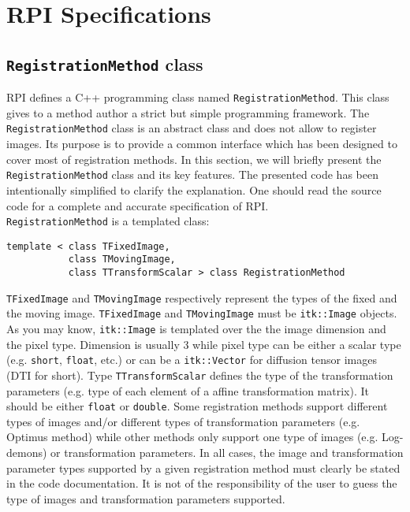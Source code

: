 \section{RPI Specifications}



\subsection{\texttt{RegistrationMethod} class}


RPI defines a C++ programming class named \texttt{RegistrationMethod}. This class gives to a method author a strict but simple programming framework. The \texttt{RegistrationMethod} class is an abstract class and does not allow to register images. Its purpose is to provide a common interface which has been designed to cover most of registration methods. In this section, we will briefly present the \texttt{RegistrationMethod} class and its key features. The presented code has been intentionally simplified to clarify the explanation. One should read the source code for a complete and accurate specification of RPI.
\\

\texttt{RegistrationMethod} is a templated class:
\\
%
\begin{lstlisting}
template < class TFixedImage,
           class TMovingImage,
           class TTransformScalar > class RegistrationMethod
\end{lstlisting}
%
\texttt{TFixedImage} and \texttt{TMovingImage} respectively represent the types of the fixed and the moving image. \texttt{TFixedImage} and \texttt{TMovingImage} must be \texttt{itk::Image} objects. As you may know, \texttt{itk::Image} is templated over the the image dimension and the pixel type. Dimension is usually 3 while pixel type can be either a scalar type (e.g. \texttt{short}, \texttt{float}, etc.) or can be a \texttt{itk::Vector} for diffusion tensor images (DTI for short). Type \texttt{TTransformScalar} defines the type of the transformation parameters (e.g. type of each element of a affine transformation matrix). It should be either \texttt{float} or \texttt{double}. Some registration methods support different types of images and/or different types of transformation parameters (e.g. Optimus method) while other methods only support one type of images (e.g. Log-demons) or transformation parameters. In all cases, the image and transformation parameter types supported by a given registration method must clearly be stated in the code documentation. It is not of the responsibility of the user to guess the type of images and transformation parameters supported.
\\

